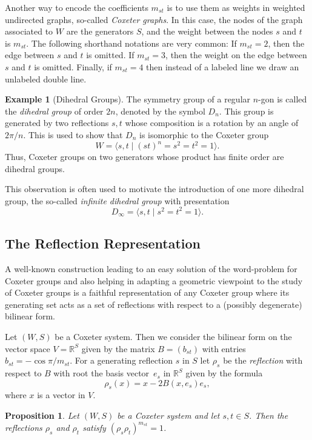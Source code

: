 \documentclass{article}
\newtheorem{proposition}[theorem]{Proposition}
\theoremstyle{definition}
\newtheorem{example}[theorem]{Example}
\begin{document}
Another way to encode the coefficients $m_{st}$ is to use them as weights in weighted undirected graphs, so-called \textit{Coxeter graphs}. In this case, the nodes of the graph associated to $W$ are the generators $S$, and the weight between the nodes $s$ and $t$ is $m_{st}$. The following shorthand notations are very common: If $m_{st} = 2$, then the edge between $s$ and $t$ is omitted. If $m_{st} = 3$, then the weight on the edge between $s$ and $t$ is omitted. Finally, if $m_{st} = 4$ then instead of a labeled line we draw an unlabeled double line.

\begin{example}[Dihedral Groups]
The symmetry group of a regular $n$-gon is called the 
\textit{dihedral group} of order $2n$, denoted by the symbol $D_n$. This group is generated by two reflections 
$s, t$ whose composition is a rotation by an angle 
of~$2\pi/n$. This is used to show that $D_n$ 
is isomorphic to the Coxeter group
$$W = \langle s, t \; | \; (st)^n = s^2 = t^2 = 1 \rangle.$$
Thus, Coxeter groups on two generators whose product has finite order are dihedral groups.

This observation is often used to motivate the introduction of one more dihedral group, the so-called \textit{infinite dihedral group} with presentation
$$D_\infty = \langle s, t \; | \; s^2 = t^2 = 1 \rangle.$$
\end{example}
\subsection{The Reflection Representation}
A well-known construction leading to an easy solution of the word-problem for Coxeter groups and also helping in adapting a geometric viewpoint to the study of Coxeter groups is a faithful representation of any Coxeter group where its generating set acts as a set of reflections with respect to a (possibly degenerate) bilinear form.

Let $(W,S)$ be a Coxeter system. Then we consider the bilinear form on the vector space $V = \mathbb{R}^S$ given by the matrix $B = (b_{st})$ with entries $b_{st} = -\cos \pi/m_{st}$. 
For a generating reflection $s$ in $S$ let $\rho_s$ be the \textit{reflection} with respect to $B$ with root the basis vector~$e_s$ in $\mathbb{R}^S$ given by the formula
$$ \rho_s(x) = x - 2B(x, e_s)e_s,$$
where $x$ is a vector in $V$.

\begin{proposition}\label{prop:reflection-representation-well-defined}
Let $(W,S)$ be a Coxeter system and let $s, t \in S$. Then the reflections $\rho_s$ and $\rho_t$ satisfy $(\rho_s \rho_t)^{m_{st}} = 1$.
\end{proposition}
\end{document}
